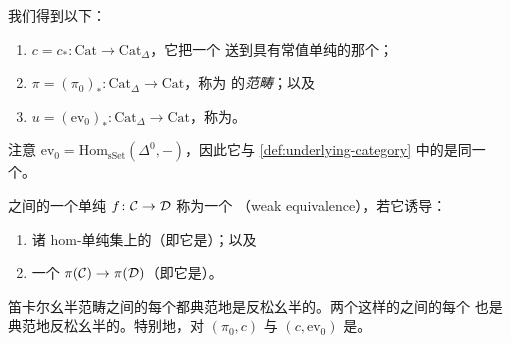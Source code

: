 \begin{definition}\label{def:functors-cat-delta}
我们得到以下\trFunctor{}：
\begin{enumerate}[label=(\arabic*)]
  \item $c = c_*\colon \mathrm{Cat} \to \mathrm{Cat}_{\Delta}$，它把一个\trCategory{}%
  送到具有常值单纯\trEnrichment{}的那个\trSimplicialCategory{}；
  \item $\pi = (\pi_0)_*\colon \mathrm{Cat}_{\Delta} \to \mathrm{Cat}$，称为%
  \trSimplicialCategory{}的\emph{\trHomotopy{}范畴}；以及
  \item $u = (\mathrm{ev}_0)_*\colon \mathrm{Cat}_{\Delta} \to \mathrm{Cat}$，称为\emph{\trUnderlyingCategory{}}。
\end{enumerate}
注意 $\mathrm{ev}_0 = \mathrm{Hom}_{\mathrm{sSet}}(\Delta^0, -)$，因此它与
\cref{def:underlying-category} 中的\trUnderlyingCategory{}是同一个。
\end{definition}

\begin{definition}\label{def:weak-equivalence-simplicial}
\trSimplicialCategory{}之间的一个单纯\trFunctor{} $f\colon \mathcal{C} \to \mathcal{D}$ 称为一个%
\emph{\trWeakEquivalence{}}（weak equivalence），若它诱导：
\begin{enumerate}[label=(\arabic*)]
  \item 诸 hom-单纯集上的\trWeakEquivalence{}（即它是\trWeaklyFullyFaithful{}）；以及
  \item 一个\trEssentiallySurjective{}\trFunctor{} $\pi(\mathcal{C}) \to \pi(\mathcal{D})$（即它是\trWeaklyEssentiallySurjective{}）。
\end{enumerate}
\end{definition}

\begin{lemma}\label{lem:oplax-canonical}
笛卡尔幺半范畴之间的每个\trFunctor{}都典范地是反松幺半的。两个这样的\trFunctor{}之间的每个\trNaturalTransformation{}%
也是典范地反松幺半的。特别地，\trAdjunction{}对 $(\pi_0, c)$ 与
$(c, \mathrm{ev}_0)$ 是\trMonoidalAdjunction{}。
\end{lemma}

